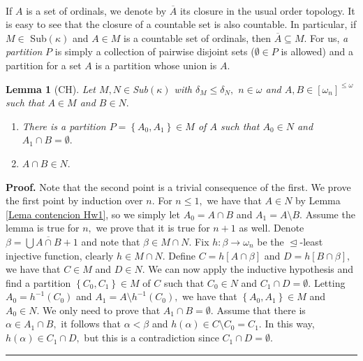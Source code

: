 \documentclass{article}%
\newtheorem{lemma}[theorem]{Lemma}
\newenvironment{proof}[1][Proof]{\noindent\textbf{#1.} }{\ \rule{0.5em}{0.5em}}
\begin{document}
\qquad\qquad\ \ 

If $A$ is a set of ordinals, we denote by $\overline{A}$ its closure in the
usual order topology. It is easy to see that the closure of a countable set is
also countable. In particular, if $M\in$ \textsf{Sub}$\left(  \kappa\right)  $
and $A\in M$ is a countable set of ordinals, then $\overline{A}\subseteq M.$
For us, \emph{a partition} $P$ is simply a collection of pairwise disjoint
sets ($\emptyset\in P$ is allowed) and a partition for a set $A$ is a
partition whose union is $A.$

\begin{lemma}
[\textsf{CH}]Let $M,N\in$\textsf{Sub}$\left(  \kappa\right)  $ with
$\delta_{M}\leq\delta_{N},$ $n\in\omega$ and $A,B\in\left[  \omega_{n}\right]
^{\leq\omega}$ such that $A\in M$ and $B\in N.$ \label{partir conjunto en dos}

\begin{enumerate}
\item There is a partition $P=\left\{  A_{0},A_{1}\right\}  \in M$ of $A$ such
that $A_{0}\in N$ and $A_{1}\cap B=\emptyset.$

\item $A\cap B\in N .$
\end{enumerate}
\end{lemma}

\begin{proof}
Note that the second point is a trivial consequence of the first. We prove the
first point by induction over $n.$ For $n\leq1,$ we have that $A\in N$ by
Lemma \ref{Lema contencion Hw1}, so we simply let $A_{0}=A\cap B$ and
$A_{1}=A\setminus B.$ Assume the lemma is true for $n,$ we prove that it is
true for $n+1$ as well. Denote $\beta=%
{\textstyle\bigcup}
\overline{A\cap B}+1$ and note that $\beta\in M\cap N.$ Fix $h:\beta
\longrightarrow\omega_{n}$ be the $\trianglelefteq$-least injective function,
clearly $h\in M\cap N.$ Define $C=h\left[  A\cap\beta\right]  $ and
$D=h\left[  B\cap\beta\right]  ,$ we have that $C\in M$ and $D\in N.$ We can
now apply the inductive hypothesis and find a partition $\left\{  C_{0}%
,C_{1}\right\}  \in M$ of $C$ such that $C_{0}\in N$ and $C_{1}\cap
D=\emptyset.$ Letting $A_{0}=h^{-1}\left(  C_{0}\right)  $ and $A_{1}%
=A\setminus h^{-1}\left(  C_{0}\right)  ,$ we have that $\left\{  A_{0}%
,A_{1}\right\}  \in M$ and $A_{0}\in N.$ We only need to prove that $A_{1}\cap
B=\emptyset.$ Assume that there is $\alpha\in A_{1}\cap B,$ it follows that
$\alpha<\beta$ and $h\left(  \alpha\right)  \in C\setminus C_{0}=C_{1}.$ In
this way, $h\left(  \alpha\right)  \in C_{1}\cap D,$ but this is a
contradiction since $C_{1}\cap D=\emptyset.$
\end{proof}
\end{document}
